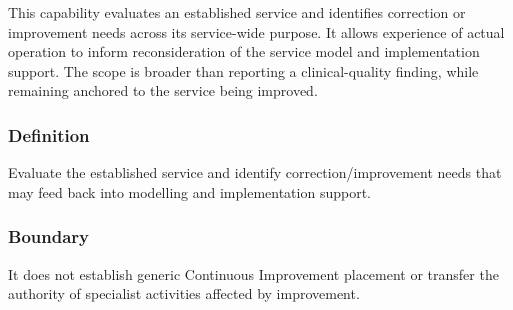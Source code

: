 This capability evaluates an established service and identifies correction or improvement needs across its service-wide purpose. It allows experience of actual operation to inform reconsideration of the service model and implementation support. The scope is broader than reporting a clinical-quality finding, while remaining anchored to the service being improved.

\subsubsection*{Definition}

Evaluate the established service and identify correction/\allowbreak{}improvement needs that may feed back into modelling and implementation support.

\subsubsection*{Boundary}

It does not establish generic Continuous Improvement placement or transfer the authority of specialist activities affected by improvement.

